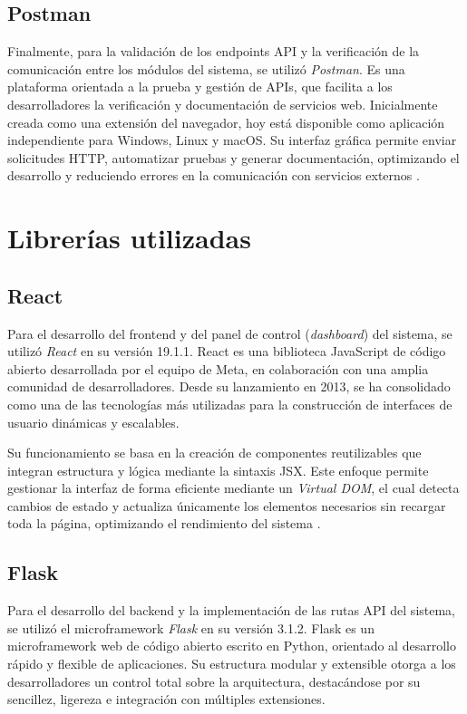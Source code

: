 \subsection{Postman}
Finalmente, para la validación de los endpoints API y la verificación de la comunicación entre los módulos del sistema, se utilizó \textit{Postman}. Es una plataforma orientada a la prueba y gestión de APIs, que facilita a los desarrolladores la verificación y documentación de servicios web. Inicialmente creada como una extensión del navegador, hoy está disponible como aplicación independiente para Windows, Linux y macOS. Su interfaz gráfica permite enviar solicitudes HTTP, automatizar pruebas y generar documentación, optimizando el desarrollo y reduciendo errores en la comunicación con servicios externos \cite{imaginaPostman}.




\section{Librerías utilizadas}

\subsection{React}

Para el desarrollo del frontend y del panel de control (\textit{dashboard}) del sistema, se utilizó \textit{React} en su versión 19.1.1. React es una biblioteca JavaScript de código abierto desarrollada por el equipo de Meta, en colaboración con una amplia comunidad de desarrolladores. Desde su lanzamiento en 2013, se ha consolidado como una de las tecnologías más utilizadas para la construcción de interfaces de usuario dinámicas y escalables.

Su funcionamiento se basa en la creación de componentes reutilizables que integran estructura y lógica mediante la sintaxis JSX. Este enfoque permite gestionar la interfaz de forma eficiente mediante un \textit{Virtual DOM}, el cual detecta cambios de estado y actualiza únicamente los elementos necesarios sin recargar toda la página, optimizando el rendimiento del sistema \cite{react}.

\subsection{Flask}
Para el desarrollo del backend y la implementación de las rutas API del sistema, se utilizó el microframework \textit{Flask} en su versión 3.1.2. Flask es un microframework web de código abierto escrito en Python, orientado al desarrollo rápido y flexible de aplicaciones. Su estructura modular y extensible otorga a los desarrolladores un control total sobre la arquitectura, destacándose por su sencillez, ligereza e integración con múltiples extensiones.

